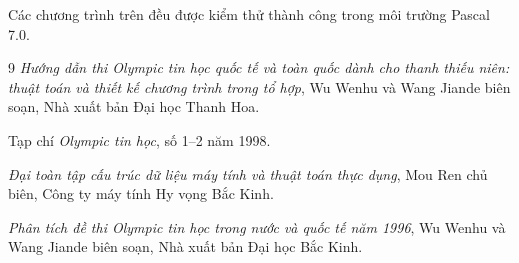 \documentclass[11pt]{article}
\begin{document}
Các chương trình trên đều được kiểm thử thành công trong môi trường Pascal
7.0.

\begin{thebibliography}{9}
\textit{Hướng dẫn thi Olympic tin học quốc tế và toàn quốc dành cho thanh
thiếu niên: thuật toán và thiết kế chương trình trong tổ hợp}, Wu Wenhu và
Wang Jiande biên soạn, Nhà xuất bản Đại học Thanh Hoa.

Tạp chí \textit{Olympic tin học}, số 1--2 năm 1998.

\textit{Đại toàn tập cấu trúc dữ liệu máy tính và thuật toán thực dụng}, Mou
Ren chủ biên, Công ty máy tính Hy vọng Bắc Kinh.

\textit{Phân tích đề thi Olympic tin học trong nước và quốc tế năm 1996}, Wu
Wenhu và Wang Jiande biên soạn, Nhà xuất bản Đại học Bắc Kinh.
\end{thebibliography}
\end{document}
